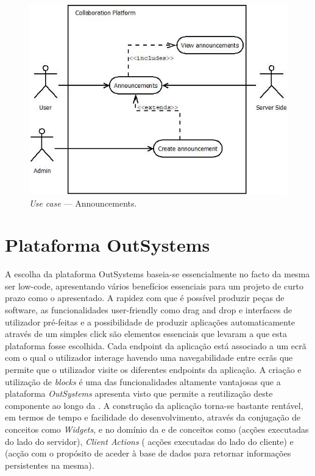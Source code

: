\begin{figure}[H]
    \centering
    \includegraphics[scale=0.6]{figures/Announcements use case.jpeg}
    \caption{\textit{Use case} --- Announcements.}\label{fig:uc:announcements}
\end{figure}

\section{Plataforma OutSystems}\label{sec:plataformaOutSystems}

A escolha da plataforma OutSystems baseia-se essencialmente no facto da mesma ser low-code,
apresentando vários benefícios essenciais para um projeto de curto prazo como o apresentado. A rapidez
com que é possível produzir peças de software, as funcionalidades user-friendly como drag and drop e 
interfaces de utilizador pré-feitas e a possibilidade de produzir aplicações automaticamente através de
um simples click são elementos essenciais que levaram a que esta plataforma fosse escolhida. Cada endpoint da aplicação está associado a um ecrã com o qual o utilizador interage havendo uma navegabilidade entre ecrãs que permite que o utilizador visite os diferentes endpoints da aplicação. A criação e utilização de \textit{blocks} é uma das funcionalidades altamente vantajosas que a plataforma \textit{OutSystems} apresenta visto que permite a reutilização deste componente ao longo da . A construção da aplicação torna-se bastante rentável, em termos de tempo e facilidade do desenvolvimento, através da conjugação de conceitos como \textit{Widgets},  e  no domínio da   e de conceitos como  (acções executadas do lado do servidor), \textit{Client Actions} ( acções executadas do lado do cliente) e  (acção com o propósito de aceder à base de dados para retornar informações persistentes na mesma). 